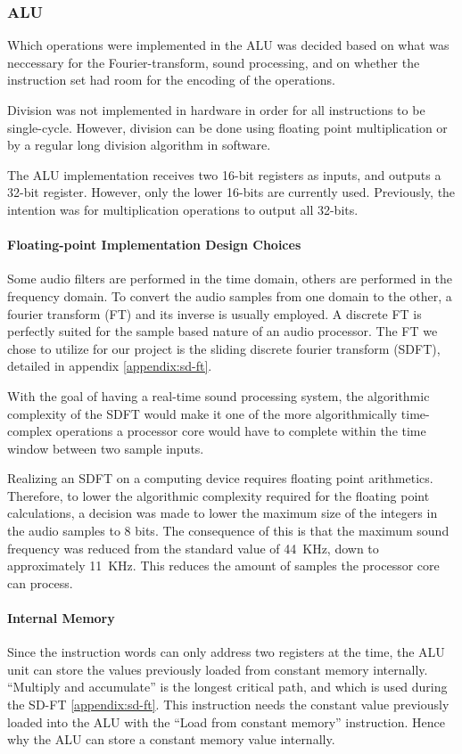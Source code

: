 \FloatBarrier
\subsubsection{ALU}\label{subsec:fpga-alu}

Which operations were implemented in the ALU was decided based on what
was neccessary for the Fourier-transform, sound processing, and on whether the
instruction set had room for the encoding of the operations.

Division was not implemented in hardware in order for all instructions to be
single-cycle. However, division can be done using floating point multiplication
or by a regular long division algorithm in software.

The ALU implementation receives two 16-bit registers as inputs, and outputs a
32-bit register. However, only the lower 16-bits are currently used. Previously,
the intention was for multiplication operations to output all 32-bits.

\paragraph{Floating-point Implementation Design Choices}

Some audio filters are performed in the time domain, others are performed in the
frequency domain. To convert the audio samples from one domain to the other, a
fourier transform (FT) and its inverse is usually employed. A discrete FT is
perfectly suited for the sample based nature of an audio processor. The FT we
chose to utilize for our project is the
sliding discrete fourier transform (SDFT), detailed in appendix \ref{appendix:sd-ft}.

With the goal of having a real-time sound processing system, the algorithmic
complexity of the SDFT would make it one of the more algorithmically
time-complex operations a processor core would have to complete within the
time window between two sample inputs.

Realizing an SDFT on a computing device requires floating point arithmetics.
Therefore, to lower the algorithmic complexity required for the floating point
calculations, a decision was made to lower the maximum size of the integers in
the audio samples to 8 bits. The consequence of this is that the maximum sound
frequency was reduced from the standard value of 44~KHz, down to approximately 11~KHz.
This reduces the amount of samples the processor core can process.

\paragraph{Internal Memory}

Since the instruction words can only address two registers at the time, the ALU
unit can store the values previously loaded from constant memory internally.
``Multiply and accumulate'' is the longest critical path, and which is used
during the SD-FT \ref{appendix:sd-ft}. This instruction needs the constant value
previously loaded into the ALU with the ``Load from constant memory''
instruction. Hence why the ALU can store a constant memory value internally.
